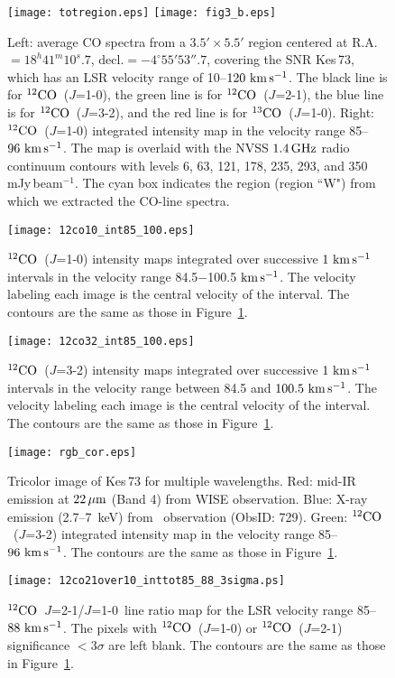 \documentclass[12pt,preprint]{aastex}
\newcommand{\kms}{\,{\km\ps}}       \newcommand{\m}{\,{\rm m}}
\newcommand{\GHz}{\,{\rm GHz}}  \newcommand{\ks}{\,{\rm ksec}}
\newcommand{\um}{\,\mu{\rm m}}    \newcommand{\mm}{\,{\rm mm}}
\newcommand{\twCO}{$^{12}{\rm CO}$}
\newcommand{\thCO}{$^{13}{\rm CO}$}
\newcommand{\Jotz}{$J$=1-0}
\newcommand{\Jtto}{$J$=2-1}
\newcommand{\Jttt}{$J$=3-2}
\begin{document}
\begin{figure}
\centering
\texttt{[image: totregion.eps]} 
\texttt{[image: fig3\_b.eps]}
\caption{{\rm Left:}  average CO spectra from a $3.5'\times 5.5'$  region centered
at R.A.$=18^h41^m10^s.7$, decl.$=-4^\circ55'53''.7$,
covering the SNR Kes\,73,  which has an LSR velocity range of 10--$120\kms$.
The black line is for \twCO~(\Jotz), the green line is for  \twCO~(\Jtto),
the blue line is for \twCO~(\Jttt), and the red line is for \thCO~(\Jotz). 
 {\rm Right:}  \twCO~(\Jotz)  integrated  intensity  map 
in the velocity range   85--$96\kms$.
The map is overlaid with  the NVSS $1.4\GHz$ radio continuum contours
with levels 6, 63, 121, 178, 235, 293, and 350 mJy\,beam$^{-1}$.
The cyan box indicates the region  (region ``W")
from which we extracted  the CO-line spectra.}
\label{fig:co_spec}
\end{figure}



\begin{figure}
\centering
\texttt{[image: 12co10\_int85\_100.eps]} 
\caption{ \twCO~(\Jotz) intensity maps  integrated over successive $1\kms$ 
intervals in the velocity range  %
84.5$-$100.5$\kms$.
 The velocity labeling each image is the central velocity of the interval.
The contours are the same as those in Figure~\ref{fig:co_spec}.
 }
\label{fig:12co10_ch86}
\end{figure}


\begin{figure}
\centering
\texttt{[image: 12co32\_int85\_100.eps]} 
\caption{ \twCO~(\Jttt) intensity maps  integrated over successive $1\kms$ 
intervals in the velocity range between %
 84.5 and $100.5\kms$.
  The velocity labeling each image is the central velocity of the interval.
The contours are the same as those in Figure~\ref{fig:co_spec}.}
\label{fig:12co32_ch86}
\end{figure}


\begin{figure}
\centering
\texttt{[image: rgb\_cor.eps]}
\caption{Tricolor image of Kes\,73  for multiple wavelengths.
Red: mid-IR emission at $22 \um$  (Band 4)  from WISE observation.
Blue: X-ray  emission (2.7--7\, keV) from \Chandra\ observation (ObsID: 729).
Green: \twCO~(\Jttt)  integrated  intensity map 
 in the velocity range  85--$96\kms$.
The contours are the same as those in Figure~\ref{fig:co_spec}.}
\label{fig:rgb}
\end{figure}


\begin{figure}
\centering
\texttt{[image: 12co21over10\_inttot85\_88\_3sigma.ps]}
\caption{ \twCO~\Jtto/\Jotz\ line ratio map  for the LSR velocity range 85--$88\kms$.
 The pixels with \twCO~(\Jotz) or \twCO~(\Jtto) significance $<3\sigma$ are left blank.
The contours are the same as those in Figure~\ref{fig:co_spec}. }
\label{fig:12co_ratio}
\end{figure}

\end{document}
